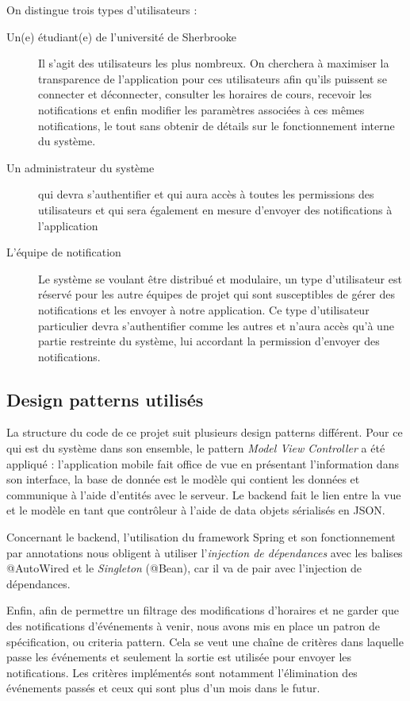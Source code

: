     On distingue trois types d'utilisateurs :
    \begin{description}
        \item[Un(e) étudiant(e) de l'université de Sherbrooke] Il s'agit des utilisateurs les plus nombreux. On cherchera à maximiser la transparence de l'application pour ces utilisateurs afin qu'ils puissent se connecter et déconnecter, consulter les horaires de cours, recevoir les notifications et enfin modifier les paramètres associées à ces mêmes notifications, le tout sans obtenir de détails sur le fonctionnement interne du système.
        \item[Un administrateur du système] qui devra s'authentifier et qui aura accès à toutes les permissions des utilisateurs et qui sera également en mesure d'envoyer des notifications à l'application
        \item[L'équipe de notification] Le système se voulant être distribué et modulaire, un type d'utilisateur est réservé pour les autre équipes de projet qui sont susceptibles de gérer des notifications et les envoyer à notre application. Ce type d'utilisateur particulier devra s'authentifier comme les autres et n'aura accès qu'à une partie restreinte du système, lui accordant la permission d'envoyer des notifications.
    \end{description}

    \subsection{Design patterns utilisés}
    La structure du code de ce projet suit plusieurs design patterns différent. Pour ce qui est du système dans son ensemble, le pattern \emph{Model View Controller} a été appliqué : l'application mobile fait office de vue en présentant l'information dans son interface, la base de donnée est le modèle qui contient les données et communique à l'aide d'entités avec le serveur. Le backend fait le lien entre la vue et le modèle en tant que contrôleur à l'aide de data objets sérialisés en JSON.

    Concernant le backend, l'utilisation du framework Spring et son fonctionnement par annotations nous obligent à utiliser l'\emph{injection de dépendances} avec les balises @AutoWired et le \emph{Singleton} (@Bean), car il va de pair avec l'injection de dépendances.

    Enfin, afin de permettre un filtrage des modifications d'horaires et ne garder que des notifications d'événements à venir, nous avons mis en place un patron de spécification, ou criteria pattern. Cela se veut une chaîne de critères dans laquelle passe les événements et seulement la sortie est utilisée pour envoyer les notifications. Les critères implémentés sont notamment l'élimination des événements passés et ceux qui sont plus d'un mois dans le futur.


